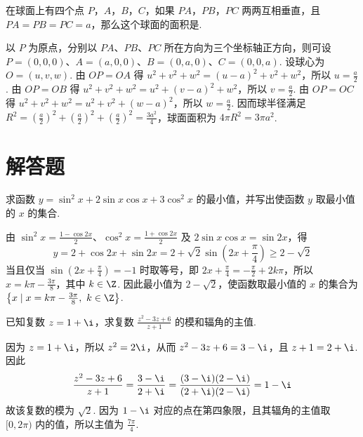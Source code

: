 \documentclass[UTF8,a4paper,oneside,11pt]{ctexbook}
\begin{document}
\begin{problem}
在球面上有四个点 \(P\)，\(A\)，\(B\)，\(C\)，如果 \(PA\)，\(PB\)，\(PC\) 两两互相垂直，且 \(PA=PB=PC=a\)，那么这个球面的面积是\fillinblank{}.


\begin{solution}
以 \(P\) 为原点，分别以 \(PA\)、\(PB\)、\(PC\) 所在方向为三个坐标轴正方向，则可设 \(P=(0,0,0)\)、\(A=(a,0,0)\)、\(B=(0,a,0)\)、\(C=(0,0,a)\). 设球心为 \(O=(u,v,w)\). 由 \(OP=OA\) 得 \(u^2+v^2+w^2=(u-a)^2+v^2+w^2\)，所以 \(u=\frac a2\). 由 \(OP=OB\) 得 \(u^2+v^2+w^2=u^2+(v-a)^2+w^2\)，所以 \(v=\frac a2\). 由 \(OP=OC\) 得 \(u^2+v^2+w^2=u^2+v^2+(w-a)^2\)，所以 \(w=\frac a2\). 因而球半径满足 \(R^2=\left(\frac a2\right)^2+\left(\frac a2\right)^2+\left(\frac a2\right)^2=\frac{3a^2}{4}\)，球面面积为 \(4\pi R^2=3\pi a^2\).
\end{solution}
\end{problem}

\section{解答题}

\begin{problem}
求函数 \(y=\sin^2 x+2\sin x\cos x+3\cos^2 x\) 的最小值，并写出使函数 \(y\) 取最小值的 \(x\) 的集合.

\begin{solution}
由 \(\sin^2x=\frac{1-\cos2x}{2}\)、\(\cos^2x=\frac{1+\cos2x}{2}\) 及 \(2\sin x\cos x=\sin2x\)，得
\[
y=2+\cos2x+\sin2x=2+\sqrt2\sin\left(2x+\frac{\pi}{4}\right)\geq 2-\sqrt2
\]
当且仅当 \(\sin\left(2x+\frac{\pi}{4}\right)=-1\) 时取等号，即 \(2x+\frac{\pi}{4}=-\frac{\pi}{2}+2k\pi\)，所以 \(x=k\pi-\frac{3\pi}{8}\)，其中 \(k\in\Z\). 因此最小值为 \(2-\sqrt2\)，使函数取最小值的 \(x\) 的集合为 \(\left\{x\mid x=k\pi-\frac{3\pi}{8},\ k\in\Z\right\}\).
\end{solution}
\end{problem}

\begin{problem}
已知复数 \(z=1+\i\)，求复数 \(\frac{z^2-3z+6}{z+1}\) 的模和辐角的主值.

\begin{solution}
因为 \(z=1+\i\)，所以 \(z^2=2\i\)，从而 \(z^2-3z+6=3-\i\)，且 \(z+1=2+\i\). 因此
\[
\frac{z^2-3z+6}{z+1}=\frac{3-\i}{2+\i}=\frac{(3-\i)(2-\i)}{(2+\i)(2-\i)}=1-\i
\]
故该复数的模为 \(\sqrt2\). 因为 \(1-\i\) 对应的点在第四象限，且其辐角的主值取 \([0,2\pi)\) 内的值，所以主值为 \(\frac{7\pi}{4}\).
\end{solution}
\end{problem}
\end{document}
